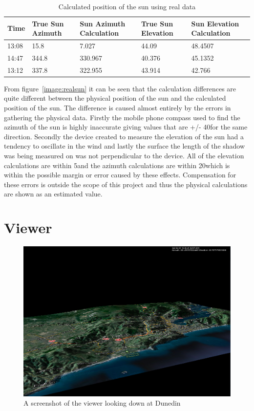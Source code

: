 \documentclass[12pt]{report}
\begin{document}
\begin{table}
\begin{tabular}{ | l | l | l | l | l}
\hline
Time & True Sun Azimuth & Sun Azimuth Calculation & True Sun Elevation & Sun Elevation Calculation\\ \hline
13:08 & 15.8 & 7.027 & 44.09 & 48.4507 \\ \hline
14:47 & 344.8 & 330.967 & 40.376 & 45.1352\\ \hline
13:12 & 337.8 & 322.955 & 43.914 & 42.766\\ \hline
\end{tabular}
\caption{Calculated position of the sun using real data}
\label{realsun}
\end{table}

From figure~\ref{image:realsun} it can be seen that the calculation differences are quite different between the physical position of the sun and the calculated position of the sun. The difference is caused almost entirely by the errors in gathering the physical data. Firstly the mobile phone compass used to find the azimuth of the sun is highly inaccurate giving values that are +/- 40\degree for the same direction. Secondly the device created to measure the elevation of the sun had a tendency to oscillate in the wind and lastly the surface the length of the shadow was being measured on was not perpendicular to the device. All of the elevation calculations are within 5\degree and the azimuth calculations are within 20\degree which is within the possible margin or error caused by these effects. Compensation for these errors is outside the scope of this project and thus the physical calculations are shown as an estimated value.\\

\chapter{Viewer}

\begin{figure}[h]
\centering
\includegraphics[scale=0.4]{viewer.png}
\caption{A screenshot of the viewer looking down at Dunedin}
\label{image:viewer}
\end{figure}
\end{document}
